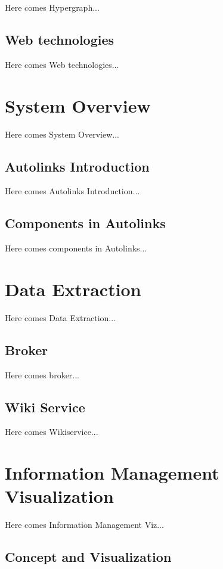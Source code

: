 \documentclass[
    fontsize=12pt,
    headings=small,
    parskip=half,           %
    bibliography=totoc,
    numbers=noenddot,       %
    open=any,               %
    ]{scrreprt}
\begin{document}
Here comes Hypergraph...

\section{Web technologies}

Here comes Web technologies...



\chapter{System Overview}

Here comes System Overview...

\section{Autolinks Introduction}

Here comes Autolinks Introduction...


\section{Components in Autolinks}

Here comes components in Autolinks...


\chapter{Data Extraction}

Here comes Data Extraction...

\section{Broker}

Here comes broker...

\section{Wiki Service}

Here comes Wikiservice...


\chapter{Information Management Visualization}

Here comes Information Management Viz...

\section{Concept and Visualization}
\end{document}
